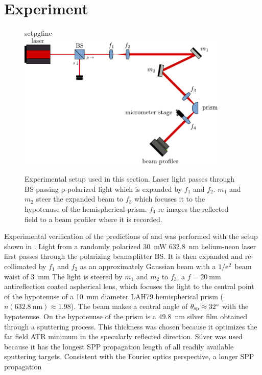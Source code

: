 \section{Experiment}
\begin{figure}[ht]
 \centering
 {setpgfinc}
 \includegraphics[keepaspectratio,width=10cm]{interference/figures/opticalsetup.pdf}
 \caption{Experimental setup used in this section.  Laser light passes
 through BS passing p-polarized light which is expanded by $f_1$ and $f_2$.
 $m_1$ and $m_2$ steer the expanded beam to $f_3$ which focuses it to the
 hypotenuse of the hemispherical prism.  $f_4$ re-images the reflected
 field to a beam profiler where it is recorded.}
 \label{fig:opticalsetup}
\end{figure}
Experimental verification of the predictions of 
and  was performed with the setup shown in
.  Light from a
randomly polarized \SI{30}{\milli\watt} \SI{632.8}{\nano\meter} helium-neon
laser first passes through the polarizing
beamsplitter BS.  It is then expanded and re-collimated by $f_1$ and $f_2$ as an
approximately Gaussian beam with a $1/{\mathrm{e}}^2$ beam waist of
\SI{3}{\milli\meter} The light is steered by $m_1$ and $m_2$ to $f_3$, a
$f=\SI{20}{\milli\meter}$ antireflection coated aspherical lens, which
focuses the light to the central point of the hypotenuse of a
\SI{10}{\milli\meter} diameter LAH79 hemispherical prism
($n(\SI{632.8}{\nano\meter})\approx1.98$).  The beam makes a central angle
of $\theta_\mathrm{sp}\approx\SI{32}{\degree}$ with the hypotenuse.
On the hypotenuse of the prism is a \SI{49.8}{\nano\meter} silver film
obtained through a sputtering process.  This thickness was chosen because
it optimizes the far field ATR minimum in the specularly reflected
direction.  Silver was used because it has the longest SPP propagation
length of all readily available sputtering targets.
Consistent with the Fourier optics perspective, a longer SPP propagation
